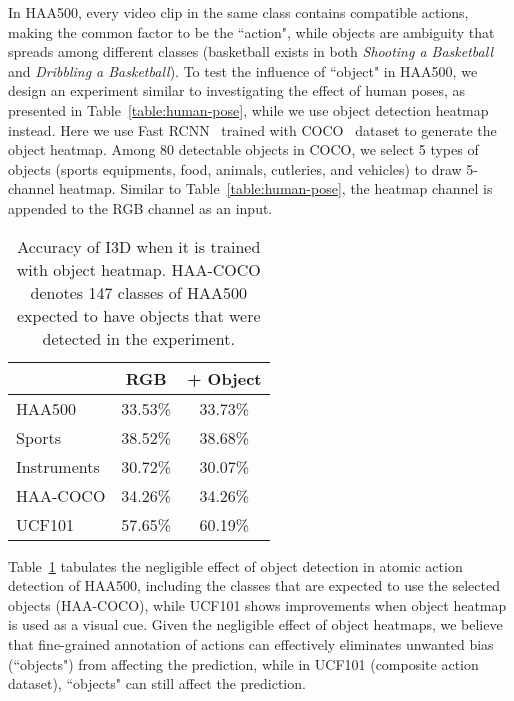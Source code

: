 \documentclass[10pt,twocolumn,letterpaper]{article}
\begin{document}
In HAA500, every video clip in the same class contains compatible actions, making the common factor to be the ``action", while objects are ambiguity that spreads among different classes (\eg basketball exists in both \textit{Shooting a Basketball} and \textit{Dribbling a Basketball}). To test the influence of ``object" in HAA500, we design an experiment similar to investigating the effect of human poses, as presented in Table~\ref{table:human-pose}, while we use object detection heatmap instead. Here we use Fast RCNN~\cite{fastrcnn} trained with COCO~\cite{coco} dataset to generate the object heatmap. Among 80 detectable objects in COCO, we select 5 types of objects (sports equipments, food, animals, cutleries, and vehicles) to draw 5-channel heatmap. Similar to Table~\ref{table:human-pose}, the heatmap channel is appended to the RGB channel as an input. 

\begin{table}[h]
    {\small 
    \begin{center}
        \begin{tabular}{| l |c |c | }
        \hline
             & RGB & + Object\\
         \hline
            HAA500            & 33.53\% & 33.73\%  \\
            \:\:  Sports      & 38.52\% & 38.68\%  \\
            \:\:  Instruments & 30.72\% & 30.07\%  \\
            \:\:  HAA-COCO    & 34.26\% & 34.26\%  \\
        \hline
            UCF101            & 57.65\% & 60.19\%   \\
        \hline
        \end{tabular}
    \end{center}}
    \caption{Accuracy of I3D when it is trained with object heatmap. HAA-COCO denotes 147 classes of HAA500 expected to have objects that were detected in the experiment.}
    \label{table:object_detection}
\end{table}

Table~\ref{table:object_detection} tabulates the negligible effect of object detection in atomic action detection of HAA500, including the classes that are expected to use the selected objects (HAA-COCO), while UCF101 shows improvements when object heatmap is used as a visual cue. 
Given the negligible effect of object heatmaps, 
we believe that fine-grained annotation of actions can effectively eliminates unwanted bias (``objects") from affecting the prediction, while in UCF101 (composite action dataset), ``objects" can still affect the prediction. 
\end{document}
